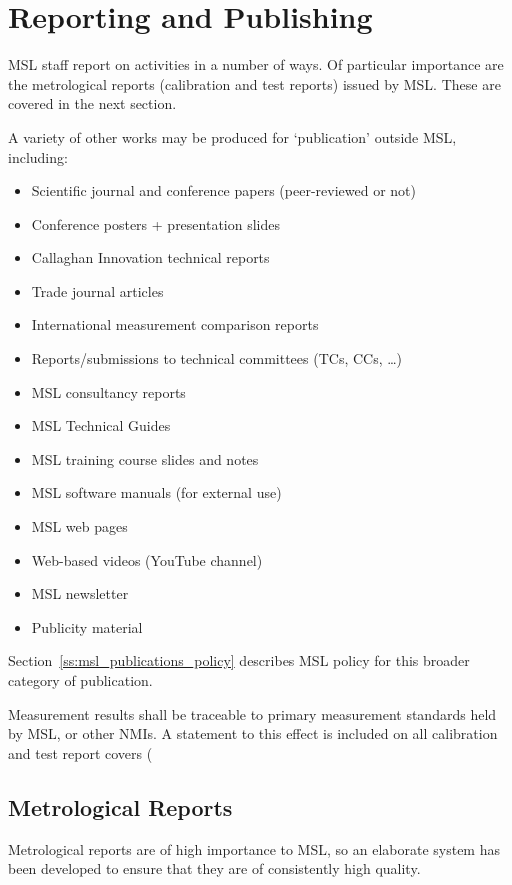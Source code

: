 \section{Reporting and Publishing}
MSL staff report on activities in a number of ways. Of particular importance are the metrological reports (calibration and test reports) issued by MSL. These are covered in the next section. 

A variety of other works may be produced for ‘publication' outside MSL, including:
\begin{itemize}
\item Scientific journal and conference papers (peer-reviewed or not)
\item Conference posters + presentation slides
\item Callaghan Innovation technical reports
\item Trade journal articles
\item International measurement comparison reports
\item Reports/submissions to technical committees (TCs, CCs, …)
\item MSL consultancy reports
\item MSL Technical Guides
\item MSL training course slides and notes
\item MSL software manuals (for external use)
\item MSL web pages
\item Web-based videos (YouTube channel)   
\item MSL newsletter
\item Publicity material
\end{itemize}

Section~\ref{ss:msl_publications_policy} describes MSL policy for this broader category of publication.

Measurement results shall be traceable to primary measurement standards held by MSL, or other NMIs. A statement to this effect is included on all calibration and test report covers (%

\subsection{Metrological Reports}
\label{ss:metrological_reports}
Metrological reports are of high importance to MSL, so an elaborate system has been developed to ensure that they are of consistently high quality.

